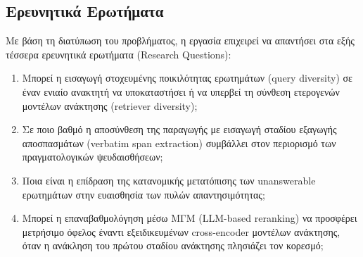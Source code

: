 \subsection{Ερευνητικά Ερωτήματα}

Με βάση τη διατύπωση του προβλήματος, η εργασία επιχειρεί να απαντήσει στα εξής τέσσερα ερευνητικά ερωτήματα (Research Questions):
\begin{enumerate}
    \item[\textbf{RQ1:}] Μπορεί η εισαγωγή στοχευμένης ποικιλότητας ερωτημάτων (query diversity) σε έναν ενιαίο ανακτητή να υποκαταστήσει ή να υπερβεί τη σύνθεση ετερογενών μοντέλων ανάκτησης (retriever diversity);
    \item[\textbf{RQ2:}] Σε ποιο βαθμό η αποσύνθεση της παραγωγής με εισαγωγή σταδίου εξαγωγής αποσπασμάτων (verbatim span extraction) συμβάλλει στον περιορισμό των πραγματολογικών ψευδαισθήσεων;
    \item[\textbf{RQ3:}] Ποια είναι η επίδραση της κατανομικής μετατόπισης των unanswerable ερωτημάτων στην ευαισθησία των πυλών απαντησιμότητας;
    \item[\textbf{RQ4:}] Μπορεί η επαναβαθμολόγηση μέσω ΜΓΜ (LLM-based reranking) να προσφέρει μετρήσιμο όφελος έναντι εξειδικευμένων cross-encoder μοντέλων ανάκτησης, όταν η ανάκληση του πρώτου σταδίου ανάκτησης πλησιάζει τον κορεσμό;
\end{enumerate}

